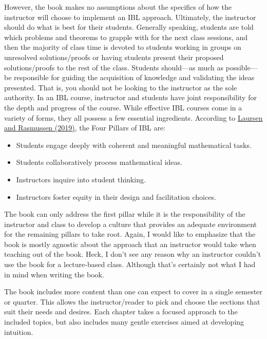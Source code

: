 \documentclass[11pt]{article}%
\newcommand{\blankline}{\pagebreak[2]\vspace{.5\baselineskip}}
\begin{document}
\blankline

However, the book makes no assumptions about the specifics of how the instructor will choose to implement an IBL approach. Ultimately, the instructor should do what is best for their students. Generally speaking, students are told which problems and theorems to grapple with for the next class sessions, and then the majority of class time is devoted to students working in groups on unresolved solutions/proofs or having students present their proposed solutions/proofs to the rest of the class. Students should---as much as possible---be responsible for guiding the acquisition of knowledge and validating the ideas presented. That is, you should not be looking to the instructor as the sole authority. In an IBL course, instructor and students have joint responsibility for the depth and progress of the course. While effective IBL courses come in a variety of forms, they all possess a few essential ingredients. According to \href{https://www.colorado.edu/eer/sites/default/files/attached-files/laursenrasmussencommentaryauthorversion0219.pdf}{Laursen and Rasmussen (2019)}, the Four Pillars of IBL are:
\begin{itemize}
\item Students engage deeply with coherent and meaningful mathematical tasks.
\item Students collaboratively process mathematical ideas.
\item Instructors inquire into student thinking.
\item Instructors foster equity in their design and facilitation choices.
\end{itemize}
The book can only address the first pillar while it is the responsibility of the instructor and class to develop a culture that provides an adequate environment for the remaining pillars to take root. Again, I would like to emphasize that the book is mostly agnostic about the approach that an instructor would take when teaching out of the book.  Heck, I don't see any reason why an instructor couldn't use the book for a lecture-based class. Although that's certainly not what I had in mind when writing the book.

\blankline

The book includes more content than one can expect to cover in a single semester or quarter. This allows the instructor/reader to pick and choose the sections that suit their needs and desires. Each chapter takes a focused approach to the included topics, but also includes many gentle exercises aimed at developing intuition.
\end{document}
